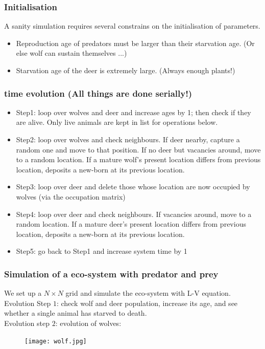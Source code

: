 \documentclass{beamer}
\begin{document}
\frame
{
  \frametitle{Initialisation}
  A sanity simulation requires several constrains on the initialisation of parameters.
  \begin{itemize}
  \item<1->{Reproduction age of predators must be larger than their starvation age. (Or else wolf can sustain themselves ...)}
  \item<2->{Starvation age of the deer is extremely large. (Always enough plants!)}
  \end{itemize} 
}

\frame
{
  \frametitle{time evolution (All things are done serially!)}
  \begin{itemize}
  \item<1->{Step1: loop over wolves and deer and increase ages by 1; then check if they are alive. Only live animals are kept in list for operations below.}
  \item<2->{Step2: loop over wolves and check neighbours. If deer nearby, capture a random one and move to that position. If no deer but vacancies around, move to a random location. If a mature wolf's present location differs from previous location, deposits a new-born at its previous location.} 
  \item<3->{Step3: loop over deer and delete those whose location are now occupied by wolves (via the occupation matrix)}
  \item<4->{Step4: loop over deer and check neighbours. If vacancies around, move to a random location. If a mature deer's present location differs from previous location, deposits a new-born at its previous location.} 
  \item<5->{Step5: go back to Step1 and increase system time by 1}
  \end{itemize} 
  
}
\frame
{
  \frametitle{Simulation of a eco-system with predator and prey}
  We set up a $N \times N$ grid and simulate the eco-system with L-V equation. \\
  Evolution Step $1$: check wolf and deer population, increase its age, and see whether a single animal has starved to death. \\
  Evolution step $2$: evolution of wolves: \\
  \begin{figure}[htb]
  \begin{center}
  \texttt{[image: wolf.jpg]}
  \label{default}
  \end{center}
  \end{figure}
}
\end{document}
